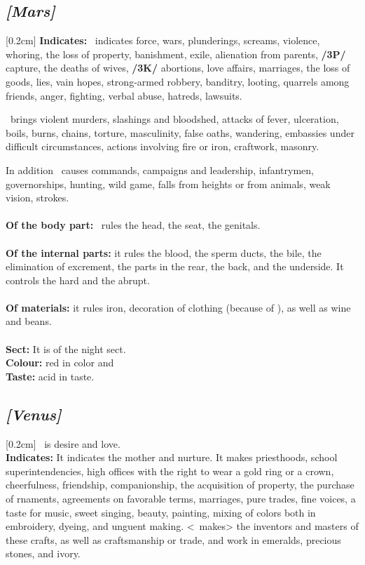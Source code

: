 \secbr
\subsection{\textit{[Mars]}}
[0.2cm]
\noindent
{}
\textbf{Indicates:} \Mars\,  indicates force, wars, plunderings, screams, violence, whoring, the loss of property, banishment, exile, alienation from parents, \textbf{/3P/} capture, the deaths of wives, \textbf{/3K/} abortions, love affairs, marriages, the loss of goods, lies, vain hopes, strong-armed robbery, banditry, looting, quarrels among friends, anger, fighting, verbal abuse, hatreds, lawsuits. 

\Mars\, brings violent murders, slashings and bloodshed, attacks of fever, ulceration, boils, burns, chains, torture, masculinity, false oaths, wandering, embassies under difficult
circumstances, actions involving fire or iron, craftwork, masonry. 

In addition \Mars\, causes commands, campaigns and leadership, infantrymen, governorships, hunting, wild game, falls from heights or from animals, weak vision, strokes. \\
\\
\textbf{Of the body part:} \Mars\, rules the head, the seat, the genitals. \\
\\
\textbf{Of the internal parts:} it rules the blood, the sperm ducts, the bile, the elimination of excrement, the parts in the rear, the back, and the underside. It controls the hard and the abrupt. \\
\\
\textbf{Of materials:} it rules iron, decoration of clothing (because of \Aries), as well as wine and beans. \\
\\
\textbf{Sect:} It is of the night sect. \\
\textbf{Colour:} red in color and \\
\textbf{Taste:} acid in taste.

\secbr
\subsection{\textit{[Venus]}}
[0.2cm]
\Venus\,  is desire and love. \\

\textbf{Indicates:} It indicates the mother and nurture. It makes priesthoods, school superintendencies, high offices with the right to wear a gold ring or a crown, cheerfulness, friendship, companionship, the acquisition of property, the purchase of rnaments, agreements on favorable terms, marriages, pure trades, fine voices, a taste for music, sweet singing, beauty, painting, mixing of colors both in embroidery, dyeing, and unguent making. <\Venus\, makes> the inventors and masters of these crafts, as well as craftsmanship or trade, and work in emeralds, precious stones, and ivory. 

